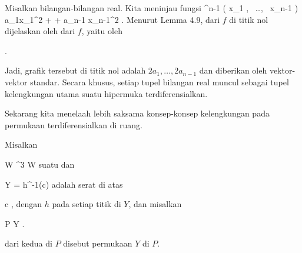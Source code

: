 {

Misalkan
 bilangan-bilangan real. Kita meninjau fungsi
 {\R^{n-1}} {\R
} { \left(  x_1   , \,   \ldots  , \,   x_{n-1}                 \right) } { a_1x_1^2  + \cdots + a_{n-1} x_{n-1}^2
} {.}
Menurut
Lemma 4.9,
dari
$f$ di titik nol dijelaskan oleh
dari $f$, yaitu oleh

 { . }

Jadi,
grafik tersebut di titik nol adalah $2a_1  , \ldots , 2a_{n-1}$ dan
diberikan oleh vektor-vektor standar. Secara khusus, setiap tupel bilangan real muncul sebagai tupel kelengkungan utama suatu hipermuka terdiferensialkan.

}


Sekarang kita menelaah lebih saksama konsep-konsep kelengkungan pada permukaan terdiferensialkan di ruang.

{}
{

Misalkan

\mavergleichskette
{\vergleichskette
{ W
}
{ \subseteq }{ \R^3
}
{  }{
}
{    }{
}
{   }{
}
}
{}{}{}
 { W } { \R
} {}
suatu
dan

\mavergleichskette
{\vergleichskette
{ Y
}
{ = }{ h^{-1}(c)
}
{  }{
}
{    }{
}
{   }{
}
}
{}{}{}
adalah serat di atas

\mavergleichskette
{\vergleichskette
{ c
}
{ \in }{ \R
}
{  }{
}
{    }{
}
{   }{
}
}
{}{}{,}
dengan $h$
pada setiap titik di $Y$, dan misalkan

\mavergleichskette
{\vergleichskette
{ P
}
{ \in }{ Y
}
{  }{
}
{    }{
}
{   }{
}
}
{}{}{.}

 dari kedua
di $P$ disebut
permukaan $Y$ di $P$.

}

